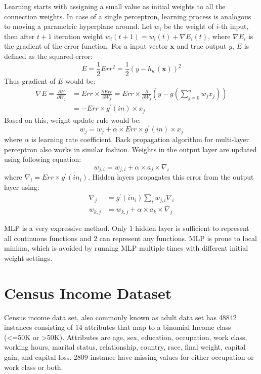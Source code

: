 Learning starts with assigning a small value as initial weights to all the connection weights. In case of a single perceptron, learning process is analogous to moving a parametric hyperplane around. Let $w_i$ be the weight of $i$-th input, then after $t+1$ iteration weight $w_i(t+1) = w_i(t) + \nabla E_i(t)$, where $\nabla E_i$ is the gradient of the error function. For a input vector $\mathbf{x}$ and true output $y$, $E$ is defined as the squared error:
\[
E = \frac{1}{2} Err^2 = \frac{1}{2} (y - h_w(\mathbf{x}))^2
\]
Thus gradient of $E$ would be:
\begin{align*}
    \nabla E = \frac{\partial E}{\partial W_j} & = Err \times \frac{\partial Err}{\partial W_j} = Err \times \frac{\partial}{\partial W_j} (y - g(\sum_{j=0}^n w_j x_j)) \\
    & = - Err \times g^{\prime} (in) \times x_j
\end{align*}
Based on this, weight update rule would be:
\[
w_j = w_j + \alpha \times Err \times g^{\prime} (in) \times x_j
\]
where $\alpha$ is learning rate coefficient. Back propagation algorithm for multi-layer perceptron also works in similar fashion. Weights in the output layer are updated using following equation:
\[
w_{j,i} = w_{j,i} + \alpha \times a_j \times \nabla_i
\]
where $\nabla_i = Err \times g^\prime(in_i)$. Hidden layers propagates this error from the output layer using:
\begin{align*}
    \nabla_j &= g^\prime (in_i) \sum_i w_{j,i} \nabla_i \\
    w_{k, j} &= w_{k, j} + \alpha \times a_k \times \nabla_j
\end{align*}

MLP is a very expressive method. Only $1$ hidden layer is sufficient to represent all continuous functions and $2$ can represent any functions. MLP is prone to local minima, which is avoided by running MLP multiple times with different initial weight settings.
\clearpage

\chapter{Census Income Dataset}
\label{appndx:ci}

Census income data set, also commonly known as adult data set has 48842 instances consisting of 14 attributes that map to a binomial Income class (<=50K or >50K). Attributes are age, sex, education, occupation, work class, working hours, marital status, relationship, country, race, final weight, capital gain, and capital loss. 2809 instance have missing values for either occupation or work class or both.

